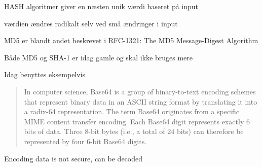 \documentclass[Screen16to9,17pt]{foils}
\begin{document}
\begin{list1}
\item HASH algoritmer giver en næsten unik værdi baseret på input
\item værdien ændres radikalt selv ved små ændringer i input
\item MD5 er blandt andet beskrevet i RFC-1321: The MD5 Message-Digest
  Algorithm
\item Både MD5 og SHA-1 er idag gamle og skal ikke bruges mere
\item Idag benyttes eksempelvis 
\end{list1}


\begin{quote}
In computer science, Base64 is a group of binary-to-text encoding schemes that represent binary data in an ASCII string format by translating it into a radix-64 representation. The term Base64 originates from a specific MIME content transfer encoding. Each Base64 digit represents exactly 6 bits of data. Three 8-bit bytes (i.e., a total of 24 bits) can therefore be represented by four 6-bit Base64 digits.
\end{quote}

\begin{list2}
	\item Encoding data is not secure, can be decoded
	\item {}
\end{list2}



\end{document}
